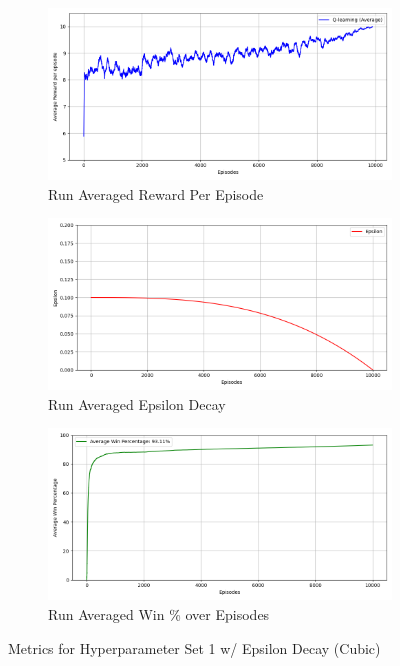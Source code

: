 \documentclass[a4paper,9pt]{scrartcl}
\begin{document}
\begin{figure}[H]
\centering
\begin{subfigure}[b]{0.32\textwidth}
\includegraphics[width=\textwidth]{images/q_learning_rewards_avg(2)(2).png}
\caption{Run Averaged Reward Per Episode}
\label{fig:rewards_avg}
\end{subfigure}
\hfill
\begin{subfigure}[b]{0.32\textwidth}
\includegraphics[width=\textwidth]{images/q_learning_epsilon_avg(2)(2).png}
\caption{Run Averaged Epsilon Decay}
\label{fig:epsilon_avg}
\end{subfigure}
\hfill
\begin{subfigure}[b]{0.32\textwidth}
\includegraphics[width=\textwidth]{images/q_learning_win_percentage_avg(2)(2).png}
\caption{Run Averaged Win \% over Episodes}
\label{fig:win_percent_avg}
\end{subfigure}
\caption{Metrics for Hyperparameter Set 1 w/ Epsilon Decay (Cubic)}
\label{fig:training_metrics}
\end{figure}
\end{document}
